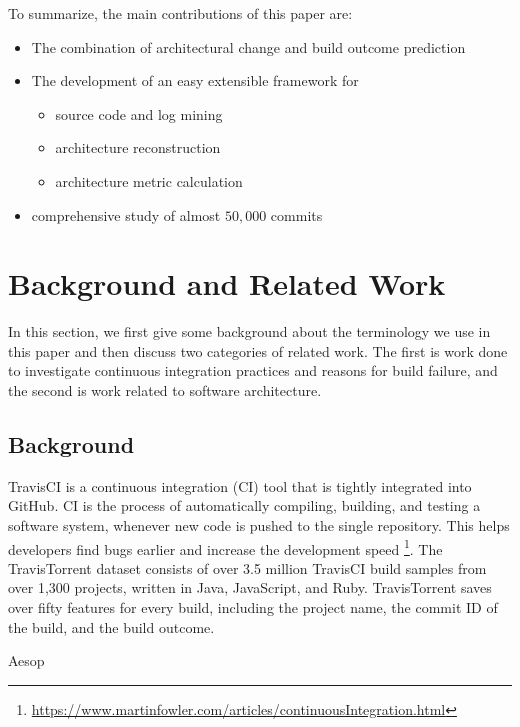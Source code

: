 \documentclass[sigplan, anonymous, review]{acmart}
\begin{document}
To summarize, the main contributions of this paper are:
\begin{itemize}
\item The combination of architectural change and build outcome prediction
\item The development of an easy extensible framework for 
\begin{itemize}
	\item source code and log mining
	\item architecture reconstruction
	\item architecture metric calculation
\end{itemize}
\item comprehensive study of almost $50,000$ commits
\end{itemize}


\section{Background and Related Work}

In this section, we first give some background about the terminology we use in this paper and then discuss two categories of related work. The first is work done to investigate continuous integration practices and reasons for build failure, and the second is work related to software architecture.

\subsection{Background}
TravisCI is a continuous integration (CI) tool that is tightly integrated into GitHub. CI is the process of automatically compiling, building, and testing a software system, whenever new code is pushed to the single repository. This helps developers find bugs earlier and increase the development speed \footnote{\url{https://www.martinfowler.com/articles/continuousIntegration.html}}. 
The TravisTorrent dataset \cite{TravisTorrent} consists of over 3.5 million TravisCI build samples from over 1,300 projects, written in Java, JavaScript, and Ruby.
TravisTorrent saves over fifty features for every build, including the project name, the commit ID of the build, and the build outcome.

Aesop
\end{document}
